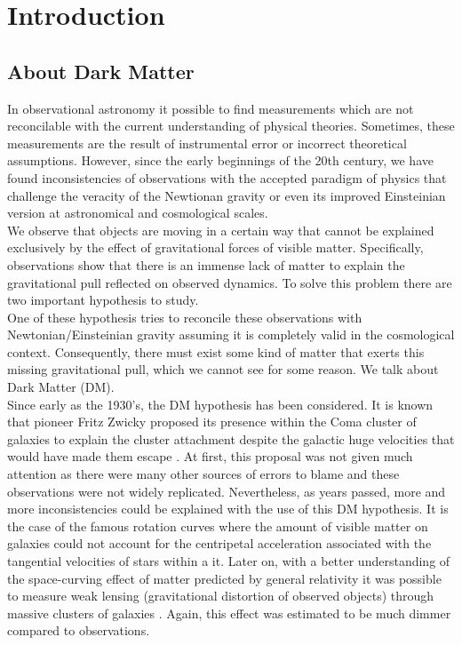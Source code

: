\chapter{Introduction}

\section{About Dark Matter}

In observational astronomy it possible to find measurements which are not reconcilable with the current understanding of physical theories. Sometimes, these measurements are the result of instrumental error or incorrect theoretical assumptions. However, since the early beginnings of the 20th century, we have found inconsistencies of observations with the accepted paradigm of physics that challenge the veracity of the Newtionan gravity or even its improved Einsteinian version at astronomical and cosmological scales.\\

We observe that objects are moving in a certain way that cannot be explained exclusively by the effect of gravitational forces of visible matter. Specifically, observations show that there is an immense lack of matter to explain the gravitational pull reflected on observed dynamics. To solve this problem there are two important hypothesis to study.\\

One of these hypothesis tries to reconcile these observations with Newtonian/Einsteinian gravity assuming it is completely valid in the cosmological context. Consequently, there must exist some kind of matter that exerts this missing gravitational pull, which we cannot see for some reason. We talk about Dark Matter (DM).\\

Since early as the 1930's, the DM hypothesis has been considered. It is known that pioneer Fritz Zwicky proposed its presence within the Coma cluster of galaxies to explain the cluster attachment despite the galactic huge velocities that would have made them escape \cite{Zwicky_1937}. At first, this proposal was not given much attention as there were many other sources of errors to blame and these observations were not widely replicated. Nevertheless, as years passed, more and more inconsistencies could be explained with the use of this DM hypothesis. It is the case of the famous rotation curves \cite{Faber_and_Gallagher_1979,Rubin_et_al._1980,Persic_et_al._1996} where the amount of visible matter on galaxies could not account for the centripetal acceleration associated with the tangential velocities of stars within a it. Later on, with a better understanding of the space-curving effect of matter predicted by general relativity it was possible to measure weak lensing (gravitational distortion of observed objects) through massive clusters of galaxies \cite{Kaiser_and_Squires,Wittman_et_al._2000,Clowe_et_al._2006}. Again, this effect was estimated to be much dimmer compared to observations.\\

